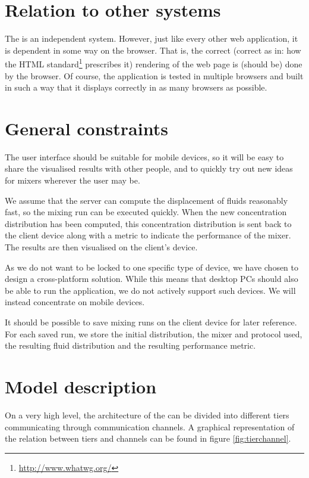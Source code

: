 \section{Relation to other systems}
\label{sec:othersys}
The \applicationname{} is an independent system. However, just like every other web application, it is dependent in some way on the browser. That is, the correct (correct as in: how the HTML standard\footnote{\url{http://www.whatwg.org/}} prescribes it) rendering of the web page is (should be) done by the browser. Of course, the application is tested in multiple browsers and built in such a way that it displays correctly in as many browsers as possible.

\section{General constraints}
\label{sec:genconst}
The user interface should be suitable for mobile devices, so it will be easy to share the visualised results with other people, and to quickly try out new ideas for mixers wherever the user may be.

We assume that the server can compute the displacement of fluids reasonably fast, so the mixing run can be executed quickly. When the new concentration distribution has been computed, this concentration distribution is sent back to the client device along with a metric to indicate the performance of the mixer. The results are then visualised on the client's device.

As we do not want to be locked to one specific type of device, we have chosen to design a cross-platform solution. While this means that desktop PCs should also be able to run the application, we do not actively support such devices. We will instead concentrate on mobile devices.

It should be possible to save mixing runs on the client device for later reference. For each saved run, we store the initial distribution, the mixer and protocol
used, the resulting fluid distribution and the resulting performance metric.

\section{Model description}
\label{sec:moddesc}
On a very high level, the architecture of the \applicationname{} can be divided into different tiers communicating through communication channels. A graphical representation of the relation between tiers and channels can be found in figure \ref{fig:tierchannel}.

